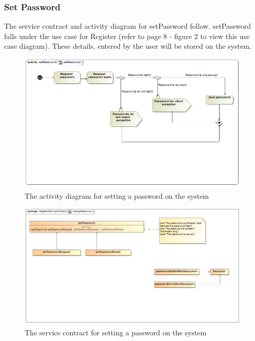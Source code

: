 \documentclass[a4paper,12pt]{article}
\begin{document}
\subsubsection{Set Password}
The service contract and activity diagram for setPassword follow. setPassword falls under the use case for Register (refer to page 8 - figure 2 to view this use case diagram). These details, entered by the user will be stored on the system.
\begin{figure}[H]
  \centering
    \includegraphics[width=1.0\textwidth]{../diagrams/Register/ActivityDiagrams/setPassword1.png}
    \caption{The activity diagram for setting a password on the system} 
\end{figure}
\begin{figure}[H]
  \centering
    \includegraphics[width=1.0\textwidth]{../diagrams/Register/ServiceContractsRegister/changePasswordServiceContract.png}
    \caption{The service contract for setting a password on the system} 
\end{figure}
\end{document}
